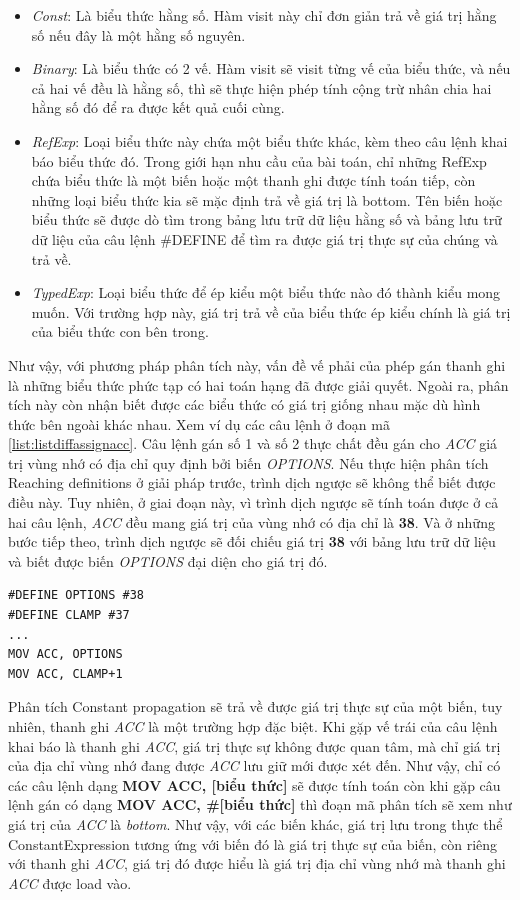 \begin{itemize}
	\item \textit{Const}: Là biểu thức hằng số. Hàm visit này chỉ đơn giản trả về giá trị hằng số nếu đây là một hằng số nguyên.
	\item \textit{Binary}: Là biểu thức có 2 vế. Hàm visit sẽ visit từng vế của biểu thức, và nếu cả hai vế đều là hằng số, thì sẽ thực hiện phép tính cộng trừ nhân chia hai hằng số đó để ra được kết quả cuối cùng.
	\item \textit{RefExp}: Loại biểu thức này chứa một biểu thức khác, kèm theo câu lệnh khai báo biểu thức đó. Trong giới hạn nhu cầu của bài toán, chỉ những RefExp chứa biểu thức là một biến hoặc một thanh ghi được tính toán tiếp, còn những loại biểu thức kia sẽ mặc định trả về giá trị là bottom. Tên biến hoặc biểu thức sẽ được dò tìm trong bảng lưu trữ dữ liệu hằng số và bảng lưu trữ dữ liệu của câu lệnh \#DEFINE để tìm ra được giá trị thực sự của chúng và trả về.
	\item \textit{TypedExp}: Loại biểu thức để ép kiểu một biểu thức nào đó thành kiểu mong muốn. Với trường hợp này, giá trị trả về của biểu thức ép kiểu chính là giá trị của biểu thức con bên trong.
\end{itemize}


Như vậy, với phương pháp phân tích này, vấn đề vế phải của phép gán thanh ghi là những biểu thức phức tạp có hai toán hạng đã được giải quyết. Ngoài ra, phân tích này còn nhận biết được các biểu thức có giá trị giống nhau mặc dù hình thức bên ngoài khác nhau. Xem ví dụ các câu lệnh ở đoạn mã \ref{list:listdiffassignacc}. Câu lệnh gán số 1 và số 2 thực chất đều gán cho \textit{ACC} giá trị vùng nhớ có địa chỉ quy định bởi biến \textit{OPTIONS}. Nếu thực hiện phân tích Reaching definitions ở giải pháp trước, trình dịch ngược sẽ không thể biết được điều này. Tuy nhiên, ở giai đoạn này, vì trình dịch ngược sẽ tính toán được ở cả hai câu lệnh, \textit{ACC} đều mang giá trị của vùng nhớ có địa chỉ là \textbf{38}. Và ở những bước tiếp theo, trình dịch ngược sẽ đối chiếu giá trị \textbf{38} với bảng lưu trữ dữ liệu và biết được biến \textit{OPTIONS} đại diện cho giá trị đó.

\begin{lstlisting}[caption={Một số câu lệnh gán cho ACC có giá trị vế phải bằng nhau},label={list:listdiffassignacc}]
#DEFINE OPTIONS #38
#DEFINE CLAMP #37
...
MOV ACC, OPTIONS
MOV ACC, CLAMP+1
\end{lstlisting}

Phân tích Constant propagation sẽ trả về được giá trị thực sự của một biến, tuy nhiên, thanh ghi \textit{ACC} là một trường hợp đặc biệt. Khi gặp vế trái của câu lệnh khai báo là thanh ghi \textit{ACC}, giá trị thực sự không được quan tâm, mà chỉ giá trị của địa chỉ vùng nhớ đang được \textit{ACC} lưu giữ mới được xét đến. Như vậy, chỉ có các câu lệnh dạng \textbf{MOV ACC, [biểu thức]} sẽ được tính toán còn khi gặp câu lệnh gán có dạng \textbf{MOV ACC, \#[biểu thức]} thì đoạn mã phân tích sẽ xem như giá trị của \textit{ACC} là \textit{bottom}. Như vậy, với các biến khác, giá trị lưu trong thực thể ConstantExpression tương ứng với biến đó là giá trị thực sự của biến, còn riêng với thanh ghi \textit{ACC}, giá trị đó được hiểu là giá trị địa chỉ vùng nhớ mà thanh ghi \textit{ACC} được load vào.
